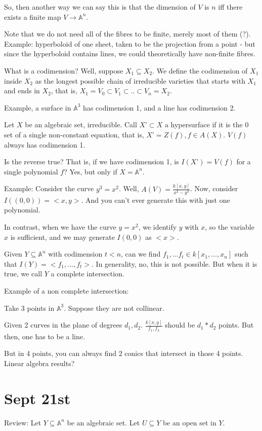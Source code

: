 \documentclass[10pt]{article}
\begin{document}
So, then another way we can say this is that the dimension of $V$ is $n$ iff there exists a finite map $V \to \mathbb{A}^n$.

Note that we do not need all of the fibres to be finite, merely most of them (?). Example: hyperboloid of one sheet, taken to be the projection from a point - but since the hyperboloid contains lines, we could theoretically have non-finite fibres.

What is a codimension? Well, suppose $X_1 \subseteq X_2$. We define the codimension of $X_1$ inside $X_2$ as the longest possible chain of irreducible varieties that starts with $X_1$ and ends in $X_2$, that is, $X_1 = V_0 \subset V_1 \subset .. \subset 
V_n = X_2$.

Example, a surface in $\mathbb{A}^3$ has codimension 1, and a line has codimension 2.

Let $X$ be an algebraic set, irreducible. Call $X’ \subset X$ a hypersurface if it is the 0 set of a single non-constant equation, that is, $X’ = Z(f), f \in A(X)$. $V(f)$ always has codimension 1.

Is the reverse true? That is, if we have codimension 1, is $I(X’) = V(f)$ for a single polynomial $f$? Yes, but only if $X = \mathbb{A}^n$.

Example: Consider the curve $y^3 = x^2$. Well, $A(V) = \frac{k[x,y]}{x^2 - y^3}$. Now, consider $I((0,0)) = <x,y>$. And you can’t ever generate this with just one polynomial. 

In contrast, when we have the curve $y = x^2$, we identify $y$ with $x$, so the variable $x$ is sufficient, and we may generate $I(0,0)$ as $<x>$.

Given $Y \subseteq \mathbb{A}^n$ with codimension $t < n$, can we find $f_1,...f_t \in k[x_1,...,x_n]$ such that $I(Y) = < f_1,...,f_t > $. In generality, no, this is not possible. But when it is true, we call $Y$ a complete intersection.

Example of a non complete intersection:

Take 3 points in $\mathbb{A}^3$. Suppose they are not collinear. 

Given 2 curves in the plane of degrees $d_1, d_2$. $\frac{k[x,y]}{f_1,f_2}$ should be $d_1 * d_2$ points. But then, one has to be a line. 

But in 4 points, you can always find 2 conics that intersect in those 4 points. Linear algebra results?

\section*{Sept 21st}
Review: Let $Y \subseteq \mathbb{A}^n$ be an algebraic set. Let $U \subseteq Y$ be an open set in $Y$.
\end{document}
